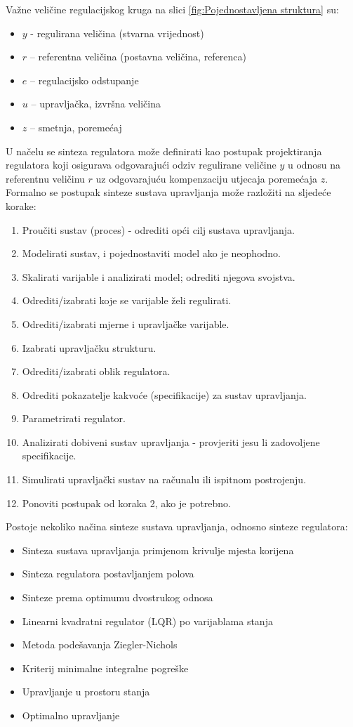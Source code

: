 \documentclass[times, utf8, diplomski]{fer}
\begin{document}
Važne veličine regulacijskog kruga na slici \ref{fig:Pojednostavljena struktura} su:
\begin{itemize}
\item $y$ - regulirana veličina (stvarna vrijednost) 
\item $r$ – referentna veličina (postavna veličina, referenca) 
\item $e$ – regulacijsko odstupanje 
\item $u$ – upravljačka, izvršna veličina 
\item $z$ – smetnja, poremećaj 
\end{itemize}
U načelu se sinteza regulatora može definirati kao postupak projektiranja regulatora koji osigurava odgovarajući odziv regulirane veličine $y$ u odnosu na referentnu veličinu $r$ uz odgovarajuću kompenzaciju utjecaja poremećaja $z$. \citep{Baotic}\\
Formalno se postupak sinteze sustava upravljanja može razložiti na sljedeće korake:
\begin{enumerate}
\item Proučiti sustav (proces) - odrediti opći cilj sustava upravljanja.
\item  Modelirati sustav, i pojednostaviti model ako je neophodno.
\item  Skalirati varijable i analizirati model; odrediti njegova svojstva.
\item  Odrediti/izabrati koje se varijable želi regulirati.
\item  Odrediti/izabrati mjerne i upravljačke varijable.
\item  Izabrati upravljačku strukturu.
\item  Odrediti/izabrati oblik regulatora.
\item  Odrediti pokazatelje kakvoće (specifikacije) za sustav upravljanja.
\item  Parametrirati regulator.
\item  Analizirati dobiveni sustav upravljanja - provjeriti jesu li zadovoljene specifikacije.
\item  Simulirati upravljački sustav na računalu ili ispitnom postrojenju.
\item  Ponoviti postupak od koraka 2, ako je potrebno.
\end{enumerate}
Postoje nekoliko načina sinteze sustava upravljanja, odnosno sinteze regulatora:
\begin{itemize}
\item Sinteza sustava upravljanja primjenom krivulje mjesta korijena
\item Sinteza regulatora postavljanjem polova
\item Sinteze prema optimumu dvostrukog odnosa
\item Linearni kvadratni regulator (LQR) po varijablama stanja
\item Metoda podešavanja Ziegler-Nichols
\item Kriterij minimalne integralne pogreške
\item Upravljanje u prostoru stanja
\item Optimalno upravljanje
\end{itemize}
\end{document}
